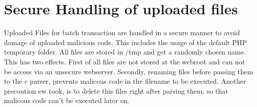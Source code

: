 \section{Secure Handling of uploaded files}
Uploaded Files for batch transaction are handled in a secure manner to avoid damage of uploaded malicious code. This includes the usage of the default PHP temporary folder. All files are stored in /tmp and get a randomly chosen name. This has two effects. First of all files are not stored at the webroot and can not be access via an unsecure webserver. Secondly, renaming files before passing them to the c parser, prevents malicous code in the filename to be executed.
\newline
Another precoution ew took, is to delete this files right after parsing them, so that malicous code can't be executed later on. 


